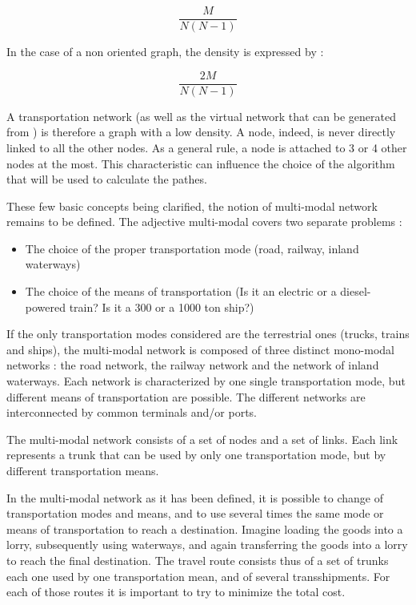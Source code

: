 $$\frac{M}{N(N-1)} $$

In the case of a non oriented graph, the density is expressed by :

$$\frac{2M}{N(N-1)} $$


A transportation network (as well as the virtual network that can be generated from ) is
therefore a graph with a low density. A node, indeed, is never directly linked
to all the other nodes.  As a general rule, a node is attached to 3 or 4 other
nodes at the most.  This characteristic can influence the choice of the
algorithm that will be used to calculate the pathes.

These few basic concepts being clarified, the notion of multi-modal network
remains to be defined.  The adjective multi-modal covers two separate problems :

\begin{itemize}
\item The choice of the proper transportation mode (road, railway, inland waterways)
\item The choice of the means of transportation (Is it an electric or a diesel-powered train?
Is it a 300 or a 1000 ton ship?)
\end{itemize}

If the only transportation modes considered are the terrestrial ones (trucks,
trains and ships), the multi-modal network is composed of three distinct
mono-modal networks : the road network, the railway network and the network of inland
waterways.  Each network is characterized by one single transportation mode, but
different means of transportation are possible.  The different networks are
interconnected by common terminals and/or ports.

The multi-modal network consists of a set of nodes and a set of links. Each link
represents a trunk that can be used by only one transportation mode, but by different
transportation means.

In the multi-modal network as it has been defined, it is possible to change of
transportation modes and means, and to use several times the same mode or means
of transportation to reach a destination.  Imagine loading the goods into a
lorry, subsequently using waterways, and again transferring the goods into a
lorry to reach the final destination.  The travel route consists thus of a set
of trunks each one used by one transportation mean, and of several
transshipments. For each of those routes it is important to try to minimize the
total cost.





